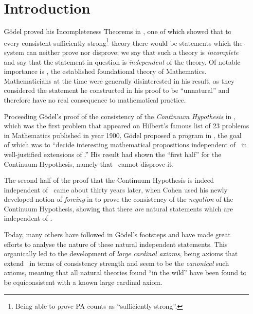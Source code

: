 \documentclass[../main]{subfiles}
\begin{document}
\chapter{Introduction}
\thispagestyle{fancy}

\setlength{\parindent}{18pt}
\begin{onehalfspacing}

G\"odel proved his Incompleteness Theorems in \cite{godel-incompleteness}, one of which showed that to every consistent sufficiently strong\footnote{Being able to prove \textsf{PA} counts as ``sufficiently strong''.} theory there would be statements which the system can neither prove nor disprove; we say that such a theory is \textit{incomplete} and say that the statement in question is \textit{independent} of the theory. Of notable importance is \zfc, the established foundational theory of Mathematics. Mathematicians at the time were generally disinterested in his result, as they considered the statement he constructed in his proof to be ``unnatural'' and therefore have no real consequence to mathematical practice.

\quad Proceeding G\"odel's proof of the consistency of the \textit{Continuum Hypothesis} in \cite{godel-continuum}, which was the first problem that appeared on Hilbert's famous list of 23 problems in Mathematics published in year 1900, G\"odel proposed a program in \cite{godel-continuum-problem}, the goal of which was to ``decide interesting mathematical propositions independent of \zfc\ in well-justified extensions of \zfc.'' His result had shown the ``first half'' for the Continuum Hypothesis, namely that \zfc\ cannot disprove it.

\quad The second half of the proof that the Continuum Hypothesis is indeed independent of \zfc\ came about thirty years later, when Cohen used his newly developed notion of \textit{forcing} in \cite{cohen} to prove the consistency of the \textit{negation} of the Continuum Hypothesis, showing that there \textit{are} natural statements which are independent of \zfc.

\quad Today, many others have followed in G\"odel's footsteps and have made great efforts to analyse the nature of these natural independent statements. This organically led to the development of \textit{large cardinal axioms}, being axioms that extend \zfc\ in terms of consistency strength and seem to be the \textit{canonical} such axioms, meaning that all natural theories found ``in the wild'' have been found to be equiconsistent with a known large cardinal axiom.


\end{onehalfspacing}
\end{document}
